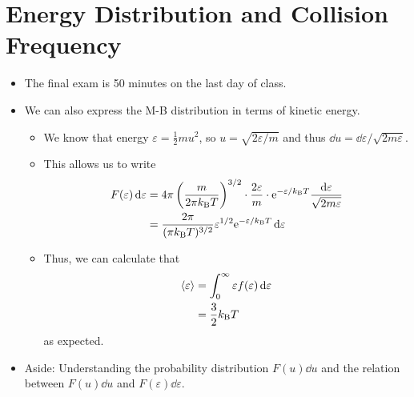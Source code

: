 \documentclass[../notes.tex]{subfiles}
\begin{document}
\section{Energy Distribution and Collision Frequency}
\begin{itemize}
    \item {}The final exam is 50 minutes on the last day of class.
    \item We can also express the M-B distribution in terms of kinetic energy.
    \begin{itemize}
        \item We know that energy $\varepsilon=\frac{1}{2}mu^2$, so $u=\sqrt{2\varepsilon/m}$ and thus $\dd{u}=\dd{\varepsilon}/\sqrt{2m\varepsilon}$.
        \item This allows us to write
        \begin{align*}
            F(\varepsilon)\dd{\varepsilon} &= 4\pi\left( \frac{m}{2\pi\kB T} \right)^{3/2}\cdot\frac{2\varepsilon}{m}\cdot\e[-\varepsilon/\kB T]\frac{\dd{\varepsilon}}{\sqrt{2m\varepsilon}}\\
            &= \frac{2\pi}{(\pi\kB T)^{3/2}}\varepsilon^{1/2}\e[-\varepsilon/\kB T]\dd{\varepsilon}
        \end{align*}
        \item Thus, we can calculate that
        \begin{align*}
            \prb{\varepsilon} &= \int_0^\infty\varepsilon f(\varepsilon)\dd{\varepsilon}\\
            &= \frac{3}{2}\kB T
        \end{align*}
        as expected.
    \end{itemize}
    \item Aside: Understanding the probability distribution $F(u)\dd{u}$ and the relation between $F(u)\dd{u}$ and $F(\varepsilon)\dd{\varepsilon}$.
    \begin{figure}[h!]
        \centering
        \begin{subfigure}[b]{0.49\linewidth}
            \centering
\end{subfigure}
\end{figure}
\end{itemize}
\end{document}
